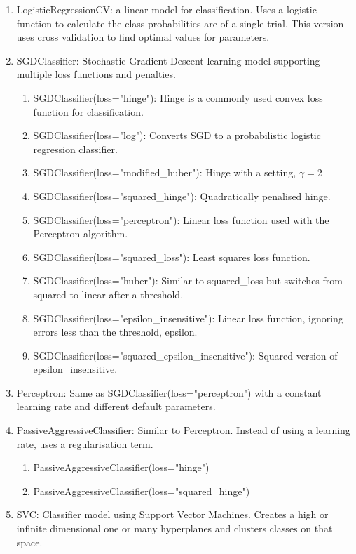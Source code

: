 \documentclass[twoside,11pt]{article}
\begin{document}
\begin{enumerate}
\item LogisticRegressionCV: a linear model for classification. Uses a logistic function to calculate the class probabilities are of a single trial. This version uses cross validation to find optimal values for parameters.
\item SGDClassifier: Stochastic Gradient Descent learning model supporting multiple loss functions and penalties. 
\begin{enumerate}
\item SGDClassifier(loss="hinge"): Hinge is a commonly used convex loss function for classification.
\item SGDClassifier(loss="log"): Converts SGD to a probabilistic logistic regression classifier.
\item SGDClassifier(loss="modified\_huber"): Hinge with a setting, $\gamma=2$
\item SGDClassifier(loss="squared\_hinge"): Quadratically penalised hinge.
\item SGDClassifier(loss="perceptron"): Linear loss function used with the Perceptron algorithm.
\item SGDClassifier(loss="squared\_loss"): Least squares loss function.
\item SGDClassifier(loss="huber"): Similar to squared\_loss but switches from squared to linear after a threshold.
\item SGDClassifier(loss="epsilon\_insensitive"): Linear loss function, ignoring errors less than the threshold, epsilon.
\item SGDClassifier(loss="squared\_epsilon\_insensitive"): Squared version of epsilon\_insensitive.
\end{enumerate}
\item Perceptron: Same as SGDClassifier(loss="perceptron") with a constant learning rate and different default parameters.
\item PassiveAggressiveClassifier: Similar to Perceptron. Instead of using a learning rate, uses a regularisation term.
\begin{enumerate}
\item PassiveAggressiveClassifier(loss="hinge")
\item PassiveAggressiveClassifier(loss="squared\_hinge")
\end{enumerate}
\item SVC: Classifier model using Support Vector Machines. Creates a high or infinite dimensional one or many hyperplanes and clusters classes on that space.
\begin{enumerate}

\end{enumerate}
\end{enumerate}
\end{document}
